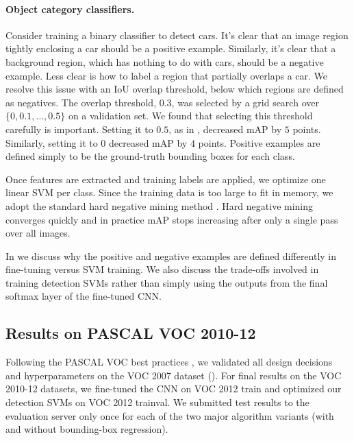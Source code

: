 \paragraph{Object category classifiers.} 
Consider training a binary classifier to detect cars.
It's clear that an image region tightly enclosing a car should be a positive example.
Similarly, it's clear that a background region, which has nothing to do with cars, should be a negative example.
Less clear is how to label a region that partially overlaps a car.
We resolve this issue with an IoU overlap threshold, below which regions are defined as negatives.
The overlap threshold, $0.3$,  was selected by a grid search over $\{0, 0.1, \ldots, 0.5\}$ on a validation set. 
We found that selecting this threshold carefully is important. 
Setting it to $0.5$, as in \cite{UijlingsIJCV2013}, decreased mAP by $5$ points. Similarly, setting it to $0$ decreased mAP by $4$ points.
Positive examples are defined simply to be the ground-truth bounding boxes for each class.

Once features are extracted and training labels are applied, we optimize one linear SVM per class.
Since the training data is too large to fit in memory, we adopt the standard hard negative mining method \cite{lsvm-pami,Sung94}. 
Hard negative mining converges quickly and in practice mAP stops increasing after only a single pass over all images.

In  we discuss why the positive and negative examples are defined differently in fine-tuning versus SVM training.
We also discuss the trade-offs involved in training detection SVMs rather than simply using the outputs from the final softmax layer of the fine-tuned CNN.


\subsection{Results on PASCAL VOC 2010-12}
Following the PASCAL VOC best practices \cite{PASCAL-IJCV}, we validated 
all design decisions and hyperparameters on the VOC 2007 dataset ().
For final results on the VOC 2010-12 datasets, we fine-tuned
the CNN on VOC 2012 train and optimized our detection SVMs on VOC 2012 trainval. 
We submitted test results to the evaluation server only once for each of the two major algorithm variants (with and without bounding-box regression).

